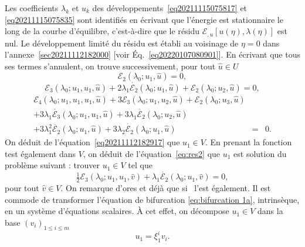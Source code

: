 \documentclass{article}
\begin{document}
Les coefficients $\lambda_k$ et $u_k$ des
d{\'e}veloppements~\eqref{eq20211115075817} et \eqref{eq20211115075835} sont
identifi{\'e}s en {\'e}crivant que l'{\'e}nergie est stationnaire le long de
la courbe d'{\'e}quilibre, c'est-{\`a}-dire que le r{\'e}sidu $\mathcal{E}_{,
u}  [u (\eta), \lambda (\eta)]$ est nul. Le d{\'e}veloppement limit{\'e} du
r{\'e}sidu est {\'e}tabli au voisinage de $\eta = 0$ dans
l'annexe~\ref{sec20211112182000} [voir {\'E}q.~\eqref{eq20220107080901}]. En
{\'e}crivant que tous ses termes s'annulent, on trouve successivement, pour
tout $\hat{u} \in U$
\begin{equation}
  \label{eq20211112182917} \mathcal{E}_2 (\lambda_0 ; u_1, \hat{u}) = 0,
\end{equation}
\begin{equation}
  \label{eq:res2} \mathcal{E}_3 (\lambda_0 ; u_1, u_1, \hat{u}) + 2 \lambda_1
  \dot{\mathcal{E}_2} (\lambda_0 ; u_1, \hat{u}) +\mathcal{E}_2 (\lambda_0 ;
  u_2, \hat{u}) = 0,
\end{equation}
\begin{eqnarray}
  \mathcal{E}_4 (\lambda_0 ; u_1, u_1, u_1, \hat{u}) + 3\mathcal{E}_3
  (\lambda_0 ; u_1, u_2, \hat{u}) +\mathcal{E}_2 (\lambda_0 ; u_3, \hat{u}) &
  &  \nonumber\\
  + 3 \lambda_1  \dot{\mathcal{E}_3} (\lambda_0 ; u_1, u_1, \hat{u}) + 3
  \lambda_1  \dot{\mathcal{E}_2} (\lambda_0 ; u_2, \hat{u}) &  &  \nonumber\\
  + 3 \lambda_1^2  \ddot{\mathcal{E}_2} (\lambda_0 ; u_1, \hat{u}) + 3
  \lambda_2  \dot{\mathcal{E}_2} (\lambda_0 ; u_1, \hat{u}) & = & 0.
  \label{eq:res3}
\end{eqnarray}
On d{\'e}duit de l'{\'e}quation~\eqref{eq20211112182917} que $u_1 \in V$. En
prenant la fonction test {\'e}galement dans $V$, on d{\'e}duit de
l'{\'e}quation~\eqref{eq:res2} que $u_1$ est solution du probl{\`e}me suivant
: trouver $u_1 \in V$ tel que
\begin{equation}
  \label{eq:bifurcation 1a} \tfrac{1}{2} \mathcal{E}_3 (\lambda_0 ; u_1, u_1,
  \hat{v}) + \lambda_1  \dot{\mathcal{E}_2} (\lambda_0 ; u_1, \hat{v}) = 0,
\end{equation}
pour tout $\hat{v} \in V$. On remarque d'ores et d{\'e}j{\`a} que si \ l'est
{\'e}galement. Il est commode de transformer l'{\'e}quation de bifurcation
\eqref{eq:bifurcation 1a}, intrins{\`e}que, en un syst{\`e}me d'{\'e}quations
scalaires. {\`A} cet effet, on d{\'e}compose $u_1 \in V$ dans la base
$(v_i)_{1 \leqslant i \leqslant m}$
\begin{equation}
  \label{eq:decomposition u1} u_1 = \xi_1^i v_i .
\end{equation}
\end{document}
